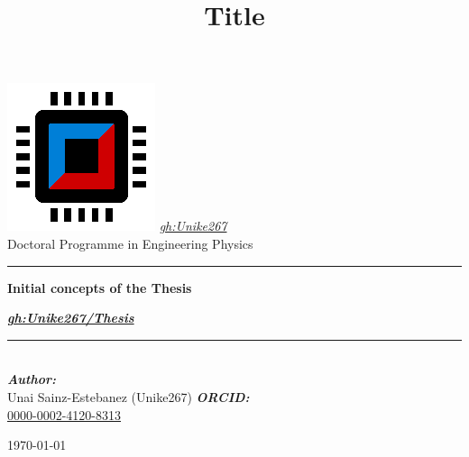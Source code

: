 
\newcommand{\gh}{\href{https://github.com/Unike267}{gh:Unike267}}
\newcommand{\type}{Doctoral Programme in Engineering Physics}
\newcommand{\titulo}{Initial concepts of the Thesis} %
\title{Title}
\newcommand{\subtitle}{\textit{\href{https://github.com/Unike267/Thesis}{gh:Unike267/Thesis}}}

\begin{center}\leavevmode
    \normalfont
    \includegraphics[width=0.35\columnwidth]{figures/logo.png}
    \vskip 10mm 
    \textit{\Large \gh}\\[1 cm]
    {\large \type}
    \vskip 5mm
    \rule{\linewidth}{0.2 mm}
    {\huge \bfseries \titulo \par}
    \vskip 5mm
    {\Large \bfseries \subtitle \par}
    \rule{\linewidth}{0.2 mm}\\[1.5 cm]
    \large
	\emph{\textbf{Author:}}\\
    Unai Sainz-Estebanez (Unike267)
    \vskip 5mm
	\emph{\textbf{ORCID:}}\\
    \href{https://orcid.org/0000-0002-4120-8313}{0000-0002-4120-8313}
    \vfill
    {\normalsize \today \par}
\end{center}
\cleardoublepage

